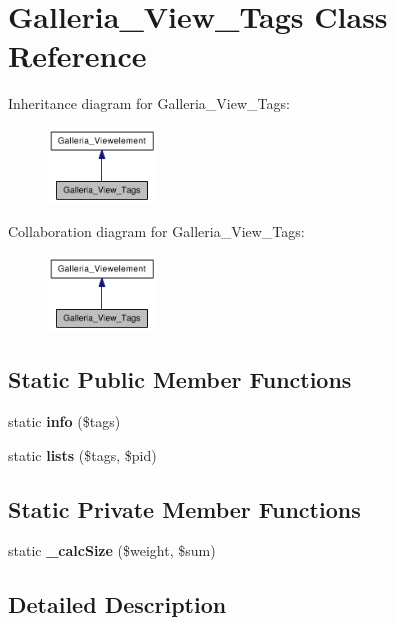 \section{Galleria\_\-View\_\-Tags Class Reference}
\label{classGalleria__View__Tags}
Inheritance diagram for Galleria\_\-View\_\-Tags:\nopagebreak
\begin{figure}[H]
\begin{center}
\leavevmode
\includegraphics[width=81pt]{classGalleria__View__Tags__inherit__graph}
\end{center}
\end{figure}
Collaboration diagram for Galleria\_\-View\_\-Tags:\nopagebreak
\begin{figure}[H]
\begin{center}
\leavevmode
\includegraphics[width=81pt]{classGalleria__View__Tags__coll__graph}
\end{center}
\end{figure}
\subsection*{Static Public Member Functions}
\begin{CompactItemize}
\item 
static {\bf info} (\$tags)
\item 
static {\bf lists} (\$tags, \$pid)
\end{CompactItemize}
\subsection*{Static Private Member Functions}
\begin{CompactItemize}
\item 
static {\bf \_\-calcSize} (\$weight, \$sum)
\end{CompactItemize}


\subsection{Detailed Description}


